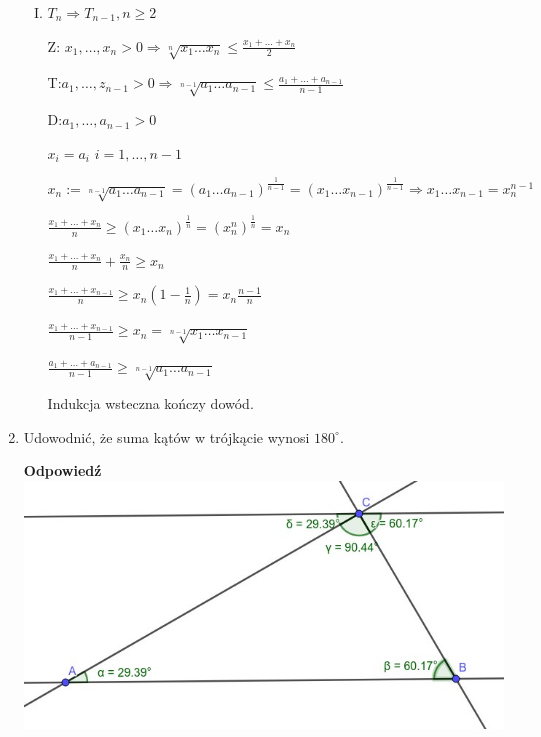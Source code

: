 \documentclass[12pt,a4paper]{article}
\theoremstyle{break}
\newcommand{\Odp}[1]{
		\begin{mdframed}[style=zadanie]
			\textbf{Odpowiedź}\\
			#1
		\end{mdframed}
	}
\begin{document}
\begin{enumerate}[1.]
{\begin{enumerate}[I)]
			$b_k:=\frac{y_{2k-1}+y_{2k}}{2}. c_k:=\sqrt{y_{2k-1}\cdot y_{2k}} \Rightarrow c_k\leq b_k$ (bo $a,b>0\Rightarrow \sqrt{ab}\leq \frac{a+b}{2}$)
			
			$\sqrt[2n]{y_1 \cdot \dots \cdot y_{2n}}=(y_1 \cdot \dots \cdot y_{2n})^\frac{1}{2n}=((y_1\cdot y_2)^\frac{1}{2}\cdot \dots \cdot (y_{2n-1}\cdot y_{2n})^\frac{1}{2})^\frac{1}{n}=(c_1\cdot \dots \cdot c_n)^\frac{1}{n}\underset{\text{z indukcji}}{\leq} \frac{c_1+\dots+c_n}{n}
			\leq \frac{b_1+\dots+b_n}{n}=\frac{y_1+\dots+y_{2n}}{2n}$
			
			\item $T_n\Rightarrow T_{n-1}, n\geq 2$
			
			Z: $x_1,\dots,x_n>0 \Rightarrow \sqrt[n]{x_1\dots x_n}\leq \frac{x_1+\dots+x_n}{2}$
			
			T:$a_1,\dots,z_{n-1}>0 \Rightarrow \sqrt[n-1]{a_1\dots a_{n-1}}\leq \frac{a_1+\dots+a_{n-1}}{n-1}$
				
			D:$a_1,\dots,a_{n-1}>0$
			
			$x_i=a_i$ $i=1,\dots,n-1$
			
			$x_n:=\sqrt[n-1]{a_1\dots a_{n-1}}=(a_1\dots a_{n-1})^\frac{1}{n-1}=(x_1\dots x_{n-1})^\frac{1}{n-1}\Rightarrow x_1\dots x_{n-1}=x_n^{n-1}$
			
			$\frac{x_1+\dots+x_n}{n}\geq (x_1\dots x_n)^\frac{1}{n}=(x_n^n)^{\frac{1}{n}}=x_n$
			
			$\frac{x_1+\dots+x_n}{n}+\frac{x_n}{n}\geq x_n$
			
			$\frac{x_1+\dots+x_{n-1}}{n}\geq x_n(1-\frac{1}{n})=x_n\frac{n-1}{n}$
			
			$\frac{x_1+\dots+x_{n-1}}{n-1}\geq x_n = \sqrt[n-1]{x_1\dots x_{n-1}}$
			
			$\frac{a_1+\dots+a_{n-1}}{n-1}\geq\sqrt[n-1]{a_1\dots a_{n-1}}$
			
			Indukcja wsteczna kończy dowód.
		\end{enumerate}
	}
	
	\item Udowodnić, że suma kątów w trójkącie wynosi $180^\circ$.
	\Odp{
		\includegraphics[width=\linewidth]{tr180.jpeg}
		
}
\end{enumerate}
\end{document}
